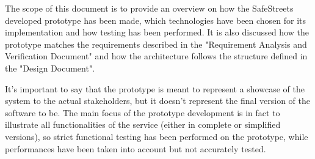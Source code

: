 The scope of this document is to provide an overview on how the SafeStreets developed prototype has been made, which technologies have been chosen for its implementation and how testing has been performed. It is also discussed how the prototype matches the requirements described in the "Requirement Analysis and Verification Document" and how the architecture follows the structure defined in the "Design Document".

It's important to say that the prototype is meant to represent a showcase of the system to the actual stakeholders, but it doesn't represent the final version of the software to be. The main focus of the prototype development is in fact to illustrate all functionalities of the service (either in complete or simplified versions), so strict functional testing has been performed on the prototype, while performances have been taken into account but not accurately tested.